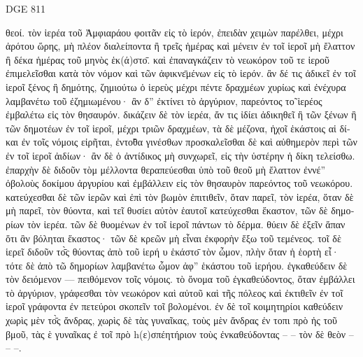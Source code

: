 \begin{versi}{DGE 811}
  \begin{greek}
    θεοί. {\verso[1]} τὸν ἱερέα τοῦ Ἀμφιαράου φοιτᾶν εἰς τὸ ἱερό{\verso}ν,
    ἐπειδὰν χειμὼν παρέλθει, μέχρι ἀρότου ὥρ{\verso}ης, μὴ πλέον
    διαλείποντα ἢ τρεῖς ἡμέρας καὶ μένειν ἐν τοῖ ἱεροῖ μὴ ἔλαττον ἢ δέκα
    ἡμέρα{\verso}ς τοῦ μηνὸς ἑκ(ά)στο̄. \: καὶ ἐπαναγκάζειν τὸ
    ν{\verso}εωκόρον τοῦ τε ἱεροῦ ἐπιμελεῖσθαι κατὰ τὸ{\verso}ν νόμον καὶ
    τῶν ἀφικνε̄μένων εἰς τὸ ἱερόν. {\verso} ἂν δέ τις ἀδικεῖ ἐν τοῖ ἱεροῖ 
    ξένος ἢ δημότης, ζημιούτω ὁ ἱερεὺς μέχρι πέντε δραχμέων {\verso} χυρίως
    καὶ ἐνέχυρα λαμβανέτω τοῦ ἐζημιωμ{\verso}ένου· ἂν δ'' ἐκτίνει τὸ
    ἀργύριον, παρεόντος το̃ {\verso} ἱερέος ἐμβαλέτω εἰς τὸν θησαυρόν. \;
    δικάζει{\verso}ν δὲ τὸν ἱερέα, ἄν τις ἰδίει ἀδικηθεῖ ἢ τῶν ξένων ἢ τῶν
    δημοτέων ἐν τοῖ ἱεροῖ, μέχρι τριῶν {\verso} δραχμέων, τὰ δὲ μέζονα,
    ἡχοῖ ἑκάστοις αἱ δίκ{\verso}αι ἐν τοῖς νόμοις εἰρῆται, ἐντο̃θα γινέσθων
    {\verso} προσκαλεῖσθαι δὲ καὶ αὐθημερὸν περὶ τῶν ἐ{\verso}ν τοῖ ἱεροῖ
    ἀιδίων· ἂν δὲ ὁ ἀντίδικος μὴ συνχωρεῖ, εἰς τὴν ὑστέρην ἡ δίκη τελείσθω.
    \; ἐπαρ{\verso}χὴν δὲ διδοῦν τὸμ μέλλοντα θεραπεύεσθαι ὑ{\verso}πὸ τοῦ
    θεοῦ μὴ ἔλαττον ἐννέ'' ὀβολοὺς δοκίμου ἀργ{\verso}υρίου καὶ ἐμβάλλειν
    εἰς τὸν θησαυρὸν παρε{\verso}όντος τοῦ νεωκόρου. κατεύχεσθαι δὲ τῶν
    ἱερῶν καὶ ἐπ{\verso}ὶ τὸν βωμὸν ἐπιτιθεῖν, ὅταν παρεῖ, τὸν ἱερέα,
    {\verso} ὅταν δὲ μὴ παρεῖ, τὸν θύοντα, καὶ τεῖ θυσίει α{\verso}ὐτὸν
    ἑαυτοῖ κατεύχεσθαι ἕκαστον, τῶν δὲ δη{\verso}μορίων τὸν ἱερέα. τῶν δὲ
    θυομένων ἐν τοῖ ἱεροῖ πάντων τὸ δέρμα. θύειν δὲ ἐξ{\verso}εῖν ἅπαν ὅτι
    ἂν βόληται ἕκαστος· τῶν δὲ κρεῶ{\verso}ν μὴ εἶναι ἐκφορὴν ἔξω τοῦ
    τεμένεος. τοῖ δὲ {\verso} ἱερεῖ διδοῦν το̄̀ς θύοντας ἀπὸ τοῦ ἱερή
    υ ἑκ{\verso}άστο̄ τὸν ὦμον, πλὴν ὅταν ἡ ἑορτὴ εἶ· τότε δὲ ἀπὸ τῶ
    δημορίων λαμβανέτω ὦμον ἀφ'' ἑκάστου {\verso} τοῦ ἱερήου. ἐγκαθεύδειν δὲ
    τὸν δειόμενο{\verso}ν{\verso} — {\verso} πειθόμ{\verso}ενον τοῖς
    νόμοις. τὸ ὄνομα τοῦ ἐγκαθεύδοντος, ὅταν ἐμβάλλει τὸ ἀργύριον,
    γράφεσθαι τ{\verso}ὸν νεωκόρον καὶ αὐτοῦ καὶ τῆς πόλεος καὶ
    ἐκ{\verso}τιθεῖν ἐν τοῖ ἱεροῖ γράφοντα ἐν πετεύροι σ{\verso}κοπεῖν τοῖ
    βολομένοι. ἐν δὲ τοῖ κοιμητηρίο{\verso}ι καθεύδειν χωρὶς μὲν το̄̀ς
    ἄνδρας, χωρὶς δὲ τὰς γυναῖκας, τοὺς μὲν ἄνδρας ἐν τοπι πρὸ
    ἠ{\verso}ς τοῦ βμοῦ, τὰς ὲ γυναῖκας ἐ
    τοῖ πρὸ h(ε)σπέ{\verso}ητήριον τοὺς
    ἐν{\verso}καθεύδοντας – – τὸν δὲ θεὸν – – –.
  \end{greek}
\end{versi}

